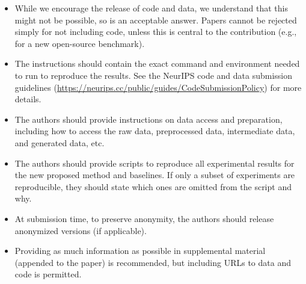 \begin{enumerate}
\begin{itemize}
        \item While we encourage the release of code and data, we understand that this might not be possible, so \answerNo{} is an acceptable answer. Papers cannot be rejected simply for not including code, unless this is central to the contribution (e.g., for a new open-source benchmark).
        \item The instructions should contain the exact command and environment needed to run to reproduce the results. See the NeurIPS code and data submission guidelines (\url{https://neurips.cc/public/guides/CodeSubmissionPolicy}) for more details.
        \item The authors should provide instructions on data access and preparation, including how to access the raw data, preprocessed data, intermediate data, and generated data, etc.
        \item The authors should provide scripts to reproduce all experimental results for the new proposed method and baselines. If only a subset of experiments are reproducible, they should state which ones are omitted from the script and why.
        \item At submission time, to preserve anonymity, the authors should release anonymized versions (if applicable).
        \item Providing as much information as possible in supplemental material (appended to the paper) is recommended, but including URLs to data and code is permitted.
    \end{itemize}



\end{enumerate}
